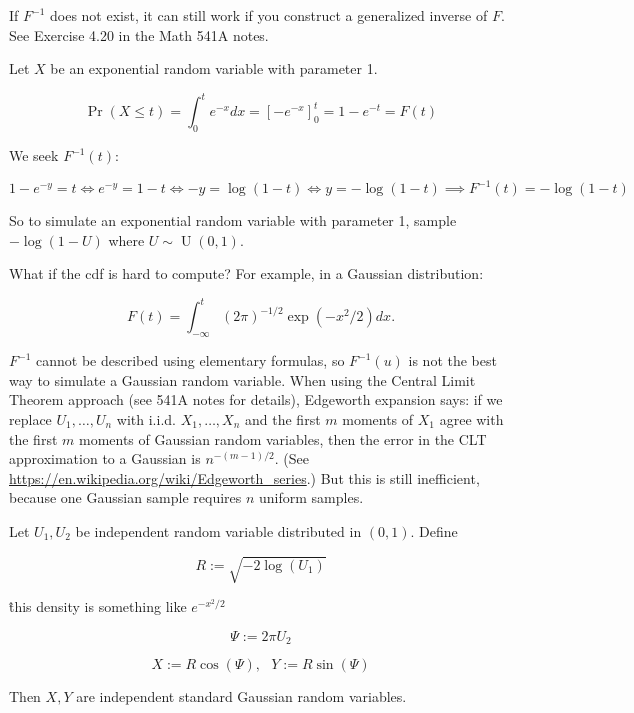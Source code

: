 \begin{remark} If \(F^{-1}\) does not exist, it can still work if you construct a generalized inverse of \(F\). See Exercise 4.20 in the Math 541A notes.

\end{remark}

\begin{example} Let \(X\) be an exponential random variable with parameter 1.

\[
\Pr(X \leq t) = \int_0^t e^{-x} dx = [- e^{-x}]_0^t = 1 - e^{-t} = F(t)
\]

We seek \(F^{-1}(t)\): 

\[
1 - e^{-y} = t \iff e^{-y} = 1 - t \iff -y = \log(1-t) \iff y = -\log(1-t) \implies F^{-1}(t) = -\log(1-t)
\]

So to simulate an exponential random variable with parameter 1, sample \(-\log(1-U)\) where \(U \sim \operatorname{U}(0,1)\).

\end{example}

\begin{remark} What if the cdf is hard to compute? For example, in a Gaussian distribution: 

\[
F(t) = \int_{-\infty}^t (2 \pi)^{-1/2} \exp(-x^2/2)  dx.
\]

\(F^{-1}\) cannot be described using elementary formulas, so \(F^{-1}(u)\) is not the best way to simulate a Gaussian random variable. When using the Central Limit Theorem approach (see 541A notes for details), Edgeworth expansion says: if we replace \(U_1, \ldots, U_n\) with i.i.d. \(X_1, \ldots, X_n\) and the first \(m\) moments of \(X_1\) agree with the first \(m\) moments of Gaussian random variables, then the error in the CLT approximation to a Gaussian is \(n^{-(m-1)/2}\). (See \url{https://en.wikipedia.org/wiki/Edgeworth_series}.) But this is still inefficient, because one Gaussian sample requires \(n\) uniform samples.

\end{remark}

\begin{proposition} Let \(U_1, U_2\) be independent random variable distributed in \((0,1)\). Define

\[
R:= \sqrt{-2 \log(U_1)}
\]

\^ this density is something like \(e^{-x^2/2}\)

\[
\Psi := 2 \pi U_2
\]

\[
X := R \cos(\Psi), \ \ \ Y:= R \sin(\Psi)
\]

Then \(X, Y\) are independent standard Gaussian random variables. 
\end{proposition}

